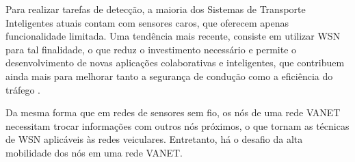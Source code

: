 \documentclass[
	12pt,				%
	oneside,			%
	a4paper,			%
	english,			%
	brazil				%
	]{abntex2ppgsi}
\begin{document}
Para realizar tarefas de detecção, a maioria dos Sistemas de Transporte Inteligentes atuais contam com sensores caros, que oferecem apenas funcionalidade limitada. Uma tendência mais recente, consiste em utilizar WSN para tal finalidade, o que reduz o investimento necessário e permite o desenvolvimento de novas aplicações colaborativas e inteligentes, que contribuem ainda mais para melhorar tanto a segurança de condução como a eficiência do tráfego \cite{losilla2011comprehensive}.

Da mesma forma que em redes de sensores sem fio, os nós de uma rede VANET necessitam trocar informações com outros nós próximos, o que tornam as técnicas de WSN aplicáveis às redes veiculares. Entretanto, há o desafio da alta mobilidade dos nós em uma rede VANET.



\end{document}

